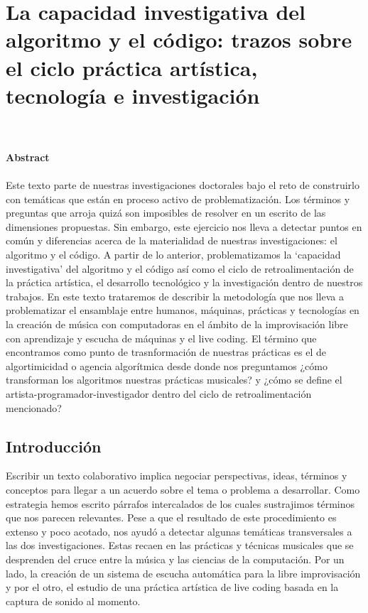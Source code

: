 \chapter{La capacidad investigativa del algoritmo y el código: trazos sobre el ciclo práctica artística, tecnología e investigación}

\author{Aaron Escobar Castañeda y Hernani Villaseñor Ramírez}
\\
\\
\textbf{Abstract}
\\
\\
Este texto parte de nuestras investigaciones doctorales bajo el reto de construirlo con temáticas que están en proceso activo de problematización. Los términos y preguntas que arroja quizá son imposibles de resolver en un escrito de las dimensiones propuestas. Sin embargo, este ejercicio nos lleva a detectar puntos en común y diferencias acerca de la materialidad de nuestras investigaciones: el algoritmo y el código. A partir de lo anterior, problematizamos la ‘capacidad investigativa’ del algoritmo y el código así como el ciclo de retroalimentación de la práctica artística, el desarrollo tecnológico y la investigación dentro de nuestros trabajos. En este texto trataremos de describir la metodología que nos lleva a problematizar el ensamblaje entre humanos, máquinas, prácticas y tecnologías en la creación de música con computadoras en el ámbito de la improvisación libre con aprendizaje y escucha de máquinas y el live coding. El término que encontramos como punto de trasnformación de nuestras prácticas es el de algortimicidad o agencia algorítmica desde donde nos preguntamos ¿cómo transforman los algoritmos nuestras prácticas musicales? y ¿cómo se define el artista-programador-investigador dentro del ciclo de retroalimentación mencionado?

\section{Introducción}
Escribir un texto colaborativo implica negociar perspectivas, ideas, términos y conceptos para llegar a un acuerdo sobre el tema o problema a desarrollar. Como estrategia hemos escrito párrafos intercalados de los cuales sustrajimos términos que nos parecen relevantes. Pese a que el resultado de este procedimiento es extenso y poco acotado, nos ayudó a detectar algunas temáticas transversales a las dos investigaciones. Estas recaen en las prácticas y técnicas musicales que se desprenden del cruce entre la música y las ciencias de la computación. Por un lado, la creación de un sistema de escucha automática para la libre improvisación y por el otro, el estudio de una práctica artística de live coding basada en la captura de sonido al momento.

